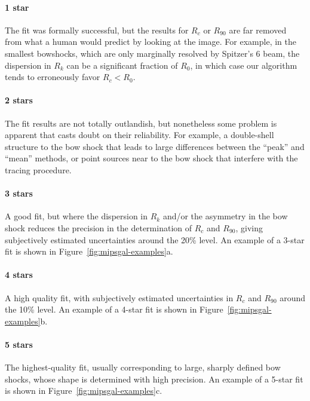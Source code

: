 \paragraph*{1 star} The fit was formally successful, but the results
for \(R_c\) or \(R_{90}\) are far removed from what a human would
predict by looking at the image.  For example, in the smallest
bowshocks, which are only marginally resolved by Spitzer's 6\arcsec{}
beam, the dispersion in \(R_k\) can be a significant fraction of
\(R_0\), in which case our algorithm tends to erroneously favor
\(R_c < R_0\).

\paragraph*{2 stars} The fit results are not totally outlandish, but
nonetheless some problem is apparent that casts doubt on their
reliability.  For example, a double-shell structure to the bow shock
that leads to large differences between the ``peak'' and ``mean''
methods, or point sources near to the bow shock that interfere with
the tracing procedure.
  
\paragraph*{3 stars} A good fit, but where the dispersion in \(R_k\)
and/or the asymmetry in the bow shock reduces the precision in the
determination of \(R_c\) and \(R_{90}\), giving subjectively estimated
uncertainties around the 20\% level.  An example of a 3-star fit is
shown in Figure~\ref{fig:mipsgal-examples}a.

\paragraph*{4 stars} A high quality fit, with subjectively estimated
uncertainties in \(R_c\) and \(R_{90}\) around the 10\% level. An
example of a 4-star fit is shown in
Figure~\ref{fig:mipsgal-examples}b.

\paragraph*{5 stars} The highest-quality fit, usually corresponding to
large, sharply defined bow shocks, whose shape is determined with high
precision. An example of a 5-star fit is shown in
Figure~\ref{fig:mipsgal-examples}c.

